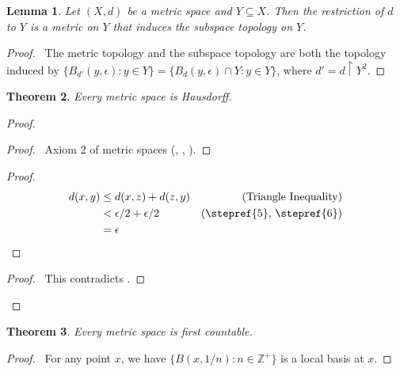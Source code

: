 \documentclass{book}
\let\qed\relax
\newtheorem{lm}{Lemma}[chapter]
\newtheorem{thm}[lm]{Theorem}
\theoremstyle{definition}
\begin{document}
  \begin{lm}
    Let $(X, d)$ be a metric space and $Y \subseteq X$. Then the restriction of 
    $d$ to $Y$ is a metric on $Y$ that induces the subspace topology on $Y$.
  \end{lm}
  
  \begin{proof}
    \pf\ The metric topology and the subspace topology are both the topology 
    induced by $\{ B_{d'}(y, \epsilon) : y \in Y \} = \{ B_d(y, \epsilon) \cap Y 
    : 
    y \in Y \}$, where $d' = d \restriction Y^2$.
  \end{proof}
  
  \begin{thm}
    Every metric space is Hausdorff.
  \end{thm}
  
  \begin{proof}
    \begin{proof}
      \pf\ Axiom 2 of metric spaces (, , ).
    \end{proof}
    \begin{proof}
      \pf\ \begin{align*}
        d(x, y) & \leq d(x, z) + d(z, y) & (\text{Triangle Inequality}) \\
        & < \epsilon / 2 + \epsilon / 2 & (\text{\stepref{5}, \stepref{6}}) \\
        & = \epsilon
      \end{align*}
    \end{proof}
    \qedstep
    \begin{proof}
      \pf\ This contradicts .
    \end{proof}
  \end{proof}
  
  \begin{thm}
    Every metric space is first countable.
  \end{thm}
  
  \begin{proof}
    \pf\ For any point $x$, we have $\{ B(x, 1/n) : n \in \mathbb{Z}^+ \}$ is a 
    local basis at $x$. \qed
  \end{proof}
  
\end{document}
